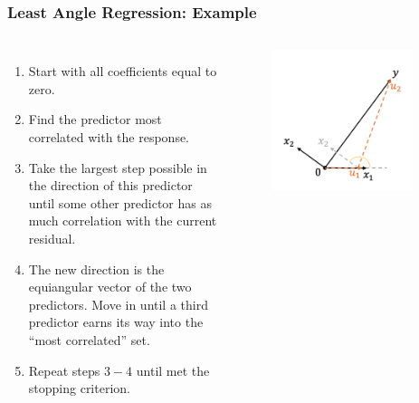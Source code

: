 \begin{frame}
\frametitle{Least Angle Regression: Example}
\begin{columns}[t]
    \begin{enumerate}
        \item Start with all coefficients equal to zero.
        \item Find the predictor most correlated with the response.
        \item Take the largest step possible in the direction of this predictor until some other predictor has as much correlation with the current residual.
        \item The new direction is the equiangular vector of the two predictors. Move in until a third predictor earns its way into the ``most correlated'' set.
        \item Repeat steps $3-4$ until met the stopping criterion.
    \end{enumerate}
    
    \begin{figure}[!htbp]
        \begin{center}
            \includegraphics[width=0.9\textwidth]{img/LAR/4.jpeg}
        \end{center}
    \end{figure}
\end{columns}
\end{frame}

